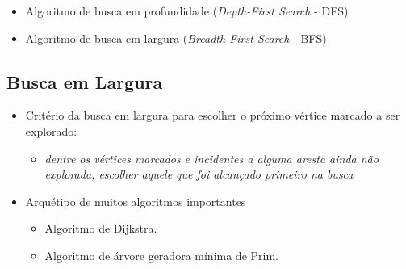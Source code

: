 \documentclass[xcolor=table]{beamer}
\begin{document}
\begin{frame}
  \begin{itemize}
    \item Algoritmo de busca em profundidade (\textit{Depth-First Search} - DFS)
    \item Algoritmo de busca em largura (\textit{Breadth-First Search} - BFS)
  \end{itemize}
\end{frame}

\subsection{Busca em Largura}
\begin{frame}
  \begin{itemize}
    \item Critério da busca em largura para escolher o próximo vértice marcado a ser explorado:
    \begin{itemize}
      \item \emph{dentre os vértices marcados e incidentes a alguma aresta ainda não explorada, escolher aquele que foi alcançado primeiro na busca}
    \end{itemize}
    \item Arquétipo de muitos algoritmos importantes
    \begin{itemize}
      \item Algoritmo de Dijkstra.
      \item Algoritmo de árvore geradora mínima de Prim.
    \end{itemize}
  \end{itemize}
\end{frame}
\end{document}
